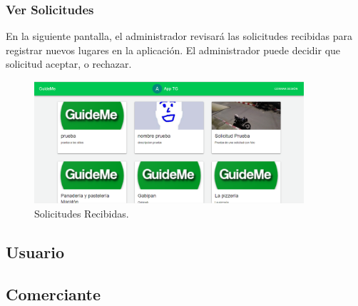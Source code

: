 \documentclass[12pt,letterpaper,openany]{book}
\begin{document}
\subsubsection{Ver Solicitudes}
En la siguiente pantalla, el administrador revisará las solicitudes recibidas para registrar nuevos lugares en la aplicación. El administrador puede decidir que solicitud aceptar, o rechazar.

\begin{figure}[H]
\begin{center}
\includegraphics[width=10cm]{./imagenes/admin/solicitudes}
\caption{Solicitudes Recibidas.}
\end{center}
\end{figure}



\subsection{Usuario}
\subsection{Comerciante}
\end{document}
